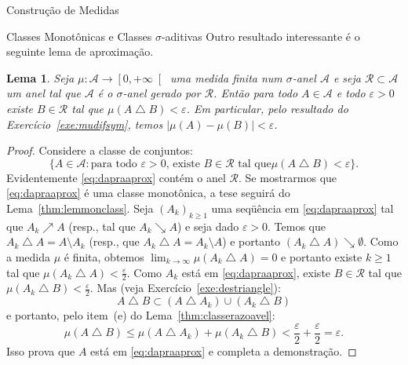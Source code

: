 \documentclass[oneside,final,11pt]{amsbook}
\theoremstyle{remark}\newtheorem{exercise}{Exercício}[chapter]
\theoremstyle{remark}\newtheorem{*exercise}[exercise]{\hbox to 0pt{\hskip 0pt minus 1fil*}Exercício}
\theoremstyle{definition}\newtheorem{exdefin}{Definição}[chapter]
\theoremstyle{plain}\newtheorem{teo}{Teorema}[section]
\theoremstyle{plain}\newtheorem{lem}[teo]{Lema}
\theoremstyle{plain}\newtheorem{prop}[teo]{Proposição}
\theoremstyle{plain}\newtheorem{cor}[teo]{Corolário}
\theoremstyle{definition}\newtheorem{defin}[teo]{Definição}
\theoremstyle{remark}\newtheorem{rem}[teo]{Observação}
\theoremstyle{definition}\newtheorem{notation}[teo]{Notação}
\theoremstyle{definition}\newtheorem{convention}[teo]{Convenção}
\theoremstyle{definition}\newtheorem{example}[teo]{Exemplo}
\numberwithin{section}{chapter}
\numberwithin{equation}{section}
\begin{document}
\begin{chapter}{Construção de Medidas}
\begin{section}{Classes Monotônicas e Classes ${\sigma}$-aditivas}
Outro resultado interessante é o seguinte lema de aproximação.
\begin{lem}\label{thm:aproxlema}
Seja $\mu:\mathcal A\to\left[0,+\infty\right[$ uma medida finita num $\sigma$-anel $\mathcal A$
e seja $\mathcal R\subset\mathcal A$ um anel tal que $\mathcal A$ é o $\sigma$-anel
gerado por $\mathcal R$. Então para todo $A\in\mathcal A$ e todo $\varepsilon>0$ existe
$B\in\mathcal R$ tal que $\mu(A\bigtriangleup B)<\varepsilon$. Em particular, pelo
resultado do Exercício~\ref{exe:mudifsym}, temos $\big\vert\mu(A)-\mu(B)\big\vert<\varepsilon$.
\end{lem}
\begin{proof}
Considere a classe de conjuntos:
\begin{equation}\label{eq:dapraaprox}
\big\{A\in\mathcal A:\text{para todo $\varepsilon>0$, existe $B\in\mathcal R$ tal que
$\mu(A\bigtriangleup B)<\varepsilon$}\big\}.
\end{equation}
Evidentemente \eqref{eq:dapraaprox} contém o anel $\mathcal R$. Se mostrarmos que
\eqref{eq:dapraaprox} é uma classe monotônica, a tese seguirá do Lema~\ref{thm:lemmonclass}.
Seja $(A_k)_{k\ge1}$ uma seqüência em \eqref{eq:dapraaprox} tal que $A_k\nearrow A$
(resp., tal que $A_k\searrow A$) e seja dado $\varepsilon>0$.
Temos que $A_k\bigtriangleup A=A\setminus A_k$ (resp.,
que $A_k\bigtriangleup A=A_k\setminus A$) e portanto $(A_k\bigtriangleup A)\searrow\emptyset$.
Como a medida $\mu$ é finita, obtemos $\lim_{k\to\infty}\mu(A_k\bigtriangleup A)=0$
e portanto existe $k\ge1$ tal que $\mu(A_k\bigtriangleup A)<\frac\varepsilon2$.
Como $A_k$ está em \eqref{eq:dapraaprox}, existe $B\in\mathcal R$ tal que
$\mu(A_k\bigtriangleup B)<\frac\varepsilon2$. Mas (veja Exercício~\ref{exe:destriangle}):
\[A\bigtriangleup B\subset(A\bigtriangleup A_k)\cup(A_k\bigtriangleup B)\]
e portanto, pelo item~(e) do Lema~\ref{thm:classerazoavel}:
\[\mu(A\bigtriangleup B)\le\mu(A\bigtriangleup A_k)+\mu(A_k\bigtriangleup B)<
\frac\varepsilon2+\frac\varepsilon2=\varepsilon.\]
Isso prova que $A$ está em \eqref{eq:dapraaprox} e completa a demonstração.
\end{proof}


\end{section}
\end{chapter}
\end{document}
